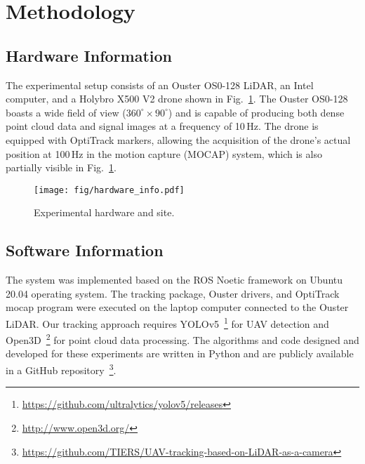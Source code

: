 
\section{Methodology}

\subsection{Hardware Information}

The experimental setup consists of an Ouster OS0-128 LiDAR, an Intel computer, and a Holybro X500 V2 drone  shown in Fig.~\ref{fig:track_device}. The Ouster OS0-128 boasts a wide field of view ($360^\circ \times 90^\circ$) and is capable of producing both dense point cloud data and signal images at a frequency of 10\,Hz. The drone is equipped with OptiTrack markers, allowing the acquisition of the drone's actual position at 100\,Hz in the motion capture (MOCAP) system, which is also partially visible in Fig.~\ref{fig:track_device}.


\begin{figure}[t] 
    \centering   
    \texttt{[image: fig/hardware\_info.pdf]}  
    \caption{Experimental hardware and site.}
    \label{fig:track_device} 
\end{figure}

\subsection{Software Information}

The system was implemented based on the ROS Noetic framework on Ubuntu 20.04 operating system. The tracking package, Ouster drivers, and OptiTrack mocap program were executed on the laptop computer connected to the Ouster LiDAR. Our tracking approach requires YOLOv5~\footnote{\href{https://github.com/ultralytics/yolov5/releases}{https://github.com/ultralytics/yolov5/releases}} for UAV detection and Open3D~\footnote{\href{http://www.open3d.org/}{http://www.open3d.org/}} for point cloud data processing. The algorithms and code designed and developed for these experiments are written in Python and are publicly available in a GitHub repository~\footnote{\href{http://github.com}{https://github.com/TIERS/UAV-tracking-based-on-LiDAR-as-a-camera}}.

